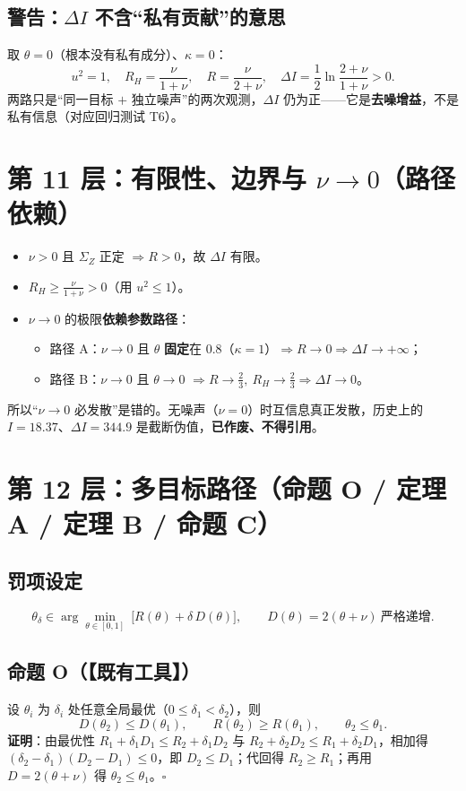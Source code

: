 \documentclass[UTF8,11pt,a4paper]{ctexart}
\begin{document}
\subsection{警告：$\Delta I$ 不含``私有贡献''的意思}
取 $\theta=0$（根本没有私有成分）、$\kappa=0$：
\[
u^2=1,\quad R_H=\frac{\nu}{1+\nu},\quad R=\frac{\nu}{2+\nu},\quad
\Delta I=\frac12\ln\frac{2+\nu}{1+\nu}>0 .
\]
两路只是``同一目标 $+$ 独立噪声''的两次观测，$\Delta I$ 仍为正——它是\textbf{去噪增益}，不是私有信息（对应回归测试 T6）。

\section{第 11 层：有限性、边界与 $\nu\to0$（路径依赖）}

\begin{itemize}
  \item $\nu>0$ 且 $\Sigma_Z$ 正定 $\Rightarrow R>0$，故 $\Delta I$ 有限。
  \item $R_H\ge \frac{\nu}{1+\nu}>0$（用 $u^2\le1$）。
  \item $\nu\to0$ 的极限\textbf{依赖参数路径}：
  \begin{itemize}
    \item 路径 A：$\nu\to0$ 且 $\theta$ \textbf{固定}在 $0.8$（$\kappa=1$）$\Rightarrow R\to0\Rightarrow \Delta I\to+\infty$；
    \item 路径 B：$\nu\to0$ 且 $\theta\to0$ $\Rightarrow R\to\frac23,\ R_H\to\frac23\Rightarrow \Delta I\to0$。
  \end{itemize}
\end{itemize}
所以``$\nu\to0$ 必发散''是错的。无噪声（$\nu=0$）时互信息真正发散，历史上的 $I=18.37$、$\Delta I=344.9$ 是截断伪值，\textbf{已作废、不得引用}。

\section{第 12 层：多目标路径（命题 O / 定理 A / 定理 B / 命题 C）}

\subsection{罚项设定}
\begin{equation}
\theta_\delta\in\arg\min_{\theta\in[0,1]}\ \big[R(\theta)+\delta\,D(\theta)\big],\qquad D(\theta)=2(\theta+\nu)\ \text{严格递增}. \label{eq:path}
\end{equation}

\subsection{命题 O（【既有工具】）}
设 $\theta_i$ 为 $\delta_i$ 处任意全局最优（$0\le\delta_1<\delta_2$），则
\[
D(\theta_2)\le D(\theta_1),\qquad R(\theta_2)\ge R(\theta_1),\qquad \theta_2\le\theta_1.
\]
\textbf{证明}：由最优性 $R_1+\delta_1D_1\le R_2+\delta_1D_2$ 与 $R_2+\delta_2D_2\le R_1+\delta_2D_1$，相加得 $(\delta_2-\delta_1)(D_2-D_1)\le0$，即 $D_2\le D_1$；代回得 $R_2\ge R_1$；再用 $D=2(\theta+\nu)$ 得 $\theta_2\le\theta_1$。$\square$
\end{document}
